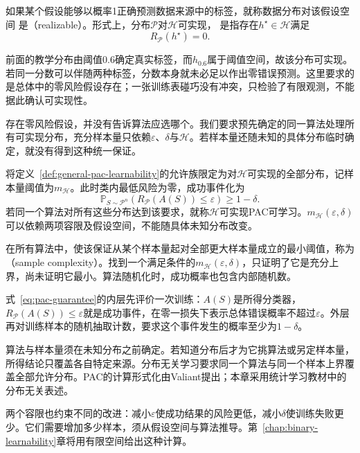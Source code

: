 \begin{definition}[可实现性]
\label{def:realizability}
如果某个假设能够以概率1正确预测数据来源中的标签，就称数据分布对该假设空间
是（realizable）。形式上，分布$\mathcal P$对$\mathcal H$可实现，
是指存在$h^\star\in\mathcal H$满足
\[
 R_{\mathcal P}(h^\star)=0.
\]
\end{definition}

前面的教学分布由阈值0.6确定真实标签，而$h_{0.6}$属于阈值空间，故该分布可实现。若同一分数可以伴随两种标签，分数本身就未必足以作出零错误预测。这里要求的是总体中的零风险假设存在；一张训练表碰巧没有冲突，只检验了有限观测，不能据此确认可实现性。

存在零风险假设，并没有告诉算法应选哪个。我们要求预先确定的同一算法处理所有可实现分布，充分样本量只依赖$\varepsilon$、$\delta$与$\mathcal H$。若样本量还随未知的具体分布临时确定，就没有得到这种统一保证。

将定义~\ref{def:general-pac-learnability}的允许族限定为对$\mathcal H$可实现的全部分布，记样本量阈值为$m_{\mathcal H}$。此时类内最低风险为零，成功事件化为
\begin{equation}
 \mathbb P_{S\sim\mathcal P^n}
 \left(R_{\mathcal P}(A(S))\leq\varepsilon\right)\geq1-\delta.
 \label{eq:pac-guarantee}
\end{equation}
若同一个算法对所有这些分布达到该要求，就称$\mathcal H$可实现PAC可学习。$m_{\mathcal H}(\varepsilon,\delta)$可以依赖两项容限及假设空间，不能随具体未知分布改变。

在所有算法中，使该保证从某个样本量起对全部更大样本量成立的最小阈值，称为（sample complexity）。找到一个满足条件的$m_{\mathcal H}(\varepsilon,\delta)$，只证明了它是充分上界，尚未证明它最小。算法随机化时，成功概率也包含内部随机数。

式~\eqref{eq:pac-guarantee}的内层先评价一次训练：$A(S)$是所得分类器，$R_{\mathcal P}(A(S))\leq\varepsilon$就是成功事件，在零一损失下表示总体错误概率不超过$\varepsilon$。外层再对训练样本的随机抽取计数，要求这个事件发生的概率至少为$1-\delta$。

算法与样本量须在未知分布之前确定。若知道分布后才为它挑算法或另定样本量，所得结论只覆盖各自特定来源。分布无关学习要求同一个算法与同一个样本上界覆盖全部允许分布。PAC的计算形式化由Valiant提出；本章采用统计学习教材中的分布无关表述。

两个容限也约束不同的改进：减小$\varepsilon$使成功结果的风险更低，减小$\delta$使训练失败更少。它们需要增加多少样本，须从假设空间与算法推导。第~\ref{chap:binary-learnability}章将用有限空间给出这种计算。

